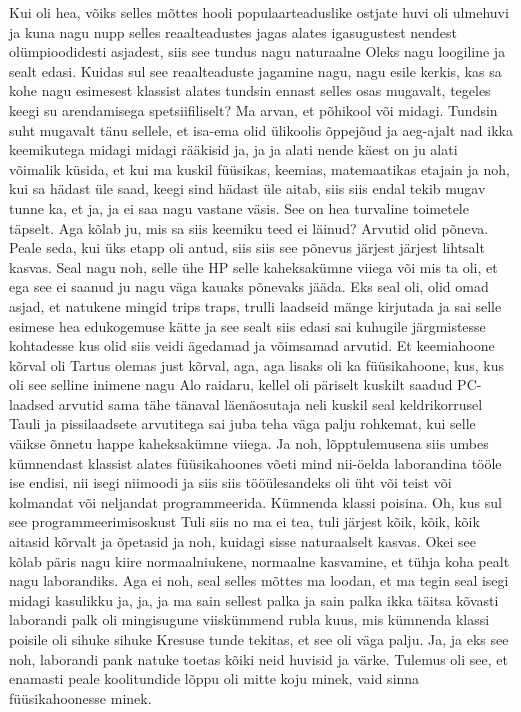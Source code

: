 Kui oli hea, võiks selles mõttes hooli populaarteaduslike ostjate huvi oli ulmehuvi ja kuna nagu nupp selles reaalteadustes jagas alates igasugustest nendest olümpioodidesti asjadest, siis see tundus nagu naturaalne
Oleks nagu loogiline ja sealt edasi. Kuidas sul see reaalteaduste jagamine nagu, nagu esile kerkis, kas sa kohe nagu esimesest klassist alates tundsin ennast selles osas mugavalt, tegeles keegi su arendamisega spetsiifiliselt? Ma arvan, et põhikool või midagi.
Tundsin suht mugavalt tänu sellele, et isa-ema olid ülikoolis õppejõud ja aeg-ajalt nad ikka keemikutega midagi midagi rääkisid ja, ja ja alati nende käest on ju alati võimalik küsida, et kui ma kuskil füüsikas, keemias, matemaatikas etajain ja noh, kui sa hädast üle saad, keegi sind hädast üle aitab, siis siis endal tekib mugav tunne ka, et ja, ja ei saa nagu vastane väsis.
See on hea turvaline toimetele täpselt. Aga kõlab ju, mis sa siis keemiku teed ei läinud?
Arvutid olid põneva. Peale seda, kui üks etapp oli antud, siis siis see põnevus järjest järjest lihtsalt kasvas.
Seal nagu noh, selle ühe HP selle kaheksakümne viiega või mis ta oli, et ega see ei saanud ju nagu väga kauaks põnevaks jääda.
Eks seal oli, olid omad asjad, et natukene mingid trips traps, trulli laadseid mänge kirjutada ja sai selle esimese hea edukogemuse kätte ja see sealt siis edasi sai kuhugile järgmistesse kohtadesse kus olid siis veidi ägedamad ja võimsamad arvutid.
Et keemiahoone kõrval oli Tartus olemas just kõrval, aga, aga lisaks oli ka füüsikahoone, kus, kus oli see selline inimene nagu Alo raidaru, kellel oli päriselt kuskilt saadud PC-laadsed arvutid sama tähe tänaval läenäosutaja neli kuskil seal keldrikorrusel Tauli ja pissilaadsete arvutitega sai juba teha väga palju rohkemat, kui selle väikse õnnetu happe kaheksakümne viiega. Ja noh, lõpptulemusena siis umbes kümnendast klassist alates füüsikahoones võeti mind nii-öelda laborandina tööle ise endisi, nii isegi niimoodi ja siis siis tööülesandeks oli üht või teist või kolmandat või neljandat programmeerida. Kümnenda klassi poisina.
Oh, kus sul see programmeerimisoskust
Tuli siis no ma ei tea, tuli järjest kõik, kõik, kõik aitasid kõrvalt ja õpetasid ja noh, kuidagi sisse naturaalselt kasvas.
Okei see kõlab päris nagu kiire normaalniukene, normaalne kasvamine, et tühja koha pealt nagu laborandiks.
Aga ei noh, seal selles mõttes ma loodan, et ma tegin seal isegi midagi kasulikku ja, ja, ja ma sain sellest palka ja sain palka ikka täitsa kõvasti laborandi palk oli mingisugune viiskümmend rubla kuus, mis kümnenda klassi poisile oli sihuke sihuke Kresuse tunde tekitas, et see oli väga palju. Ja, ja eks see noh, laborandi pank natuke toetas kõiki neid huvisid ja värke. Tulemus oli see, et enamasti peale koolitundide lõppu oli mitte koju minek, vaid sinna füüsikahoonesse minek.
